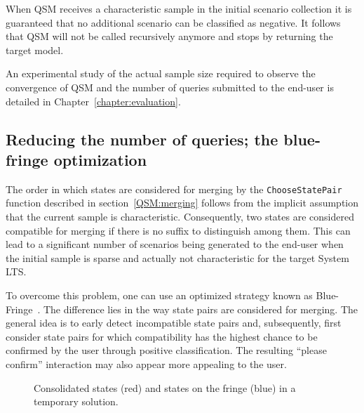 When QSM receives a characteristic sample in the initial scenario collection it is guaranteed that no additional scenario can be classified as negative. It follows that QSM will not be called recursively anymore and stops by returning the target model. 

An experimental study of the actual sample size required to observe the convergence of \textsc{QSM} and the number of queries submitted to the end-user is detailed in Chapter~\ref{chapter:evaluation}.

\subsection{Reducing the number of queries; the blue-fringe optimization\label{BlueFringe}}

The order in which states are considered for merging by the \texttt{ChooseStatePair} function described in section~\ref{QSM:merging} follows from the implicit assumption that the current sample is characteristic. Consequently, two states are considered compatible for merging if there is no suffix to distinguish among them. This can lead to a significant number of scenarios being generated to the end-user when the initial sample is sparse and actually not characteristic for the target System LTS. 

To overcome this problem, one can use an optimized strategy known as Blue-Fringe~\cite{Lang:1998}. The difference lies in the way state pairs are considered for merging. The general idea is to early detect incompatible state pairs and, subsequently, first consider state pairs for which compatibility has the highest chance to be confirmed by the user through positive classification. The resulting ``please confirm'' interaction may also appear more appealing to the user.

\begin{figure}
\hspace*{-1cm}
\vspace*{-.5cm}
\caption{Consolidated states (red) and states on the fringe (blue) in a temporary solution\label{Fig:BlueFringe}.}
\end{figure}

